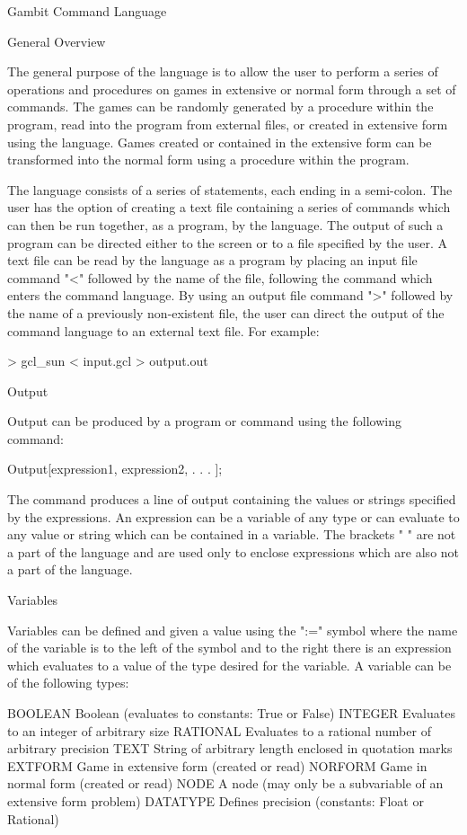 Gambit Command Language


General Overview

The general purpose of the language is to allow the user to perform a series of
operations and procedures on games in extensive or normal form through a set of
commands.  The games can be randomly generated by a procedure within the
program, read into the program from external files, or created in extensive
form using the language.  Games created or contained in the extensive form can
be transformed into the normal form using a procedure within the program.

The language consists of a series of statements, each ending in a semi-colon.
The user has the option of creating a text file containing a series of
commands which can then be run together, as a program, by the language.  The
output of such a program can be directed either to the screen or to a file
specified by the user.  A text file can be read by the language as a program
by placing an input file command "<" followed by the name of the file, 
following the command which enters the command language.  By using an output
file command ">" followed by the name of a previously non-existent file, the
user can direct the output of the command language to an external text file.
For example:

> gcl_sun < input.gcl > output.out


Output

Output can be produced by a program or command using the following command:

	Output[{expression1}, {expression2}, . . . ];

The command produces a line of output containing the values or strings 
specified by the expressions.  An expression can be a variable of any type or 
can evaluate to any value or string which can be contained in a variable.  The 
brackets "{ }" are not a part of the language and are used only to enclose
expressions which are also not a part of the language.


Variables

Variables can be defined and given a value using the ":=" symbol where the name
of the variable is to the left of the symbol and to the right there is an
expression which evaluates to a value of the type desired for the variable.
A variable can be of the following types:

	BOOLEAN		Boolean (evaluates to constants:  True or False)
	INTEGER		Evaluates to an integer of arbitrary size
	RATIONAL	Evaluates to a rational number of arbitrary precision
	TEXT		String of arbitrary length enclosed in quotation marks
	EXTFORM		Game in extensive form (created or read)
	NORFORM		Game in normal form (created or read)
	NODE		A node (may only be a subvariable of an extensive form
			problem)
	DATATYPE	Defines precision (constants:  Float or Rational)

